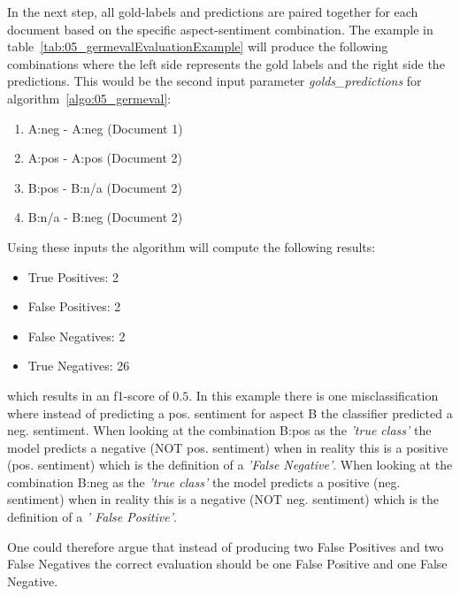 In the next step, all gold-labels and predictions are paired together for each document based on the specific aspect-sentiment combination. The example in table~\ref{tab:05_germevalEvaluationExample} will produce the following combinations where the left side represents the gold labels and the right side the predictions. This would be the second input parameter \textit{golds\_predictions} for algorithm~\ref{algo:05_germeval}: 

\begin{enumerate}
	\item A:neg - A:neg (Document 1)
	\item A:pos - A:pos (Document 2)
	\item B:pos - B:n/a (Document 2)
	\item B:n/a - B:neg (Document 2)
\end{enumerate}

Using these inputs the algorithm will compute the following results:

\begin{itemize}
	\item True Positives: 2
	\item False Positives: 2
	\item False Negatives: 2
	\item True Negatives: 26
\end{itemize}

which results in an f1-score of $0.5$. In this example there is one misclassification where instead of predicting a pos. sentiment for aspect B the classifier predicted a neg. sentiment. When looking at the combination B:pos as the \textit{'true class'} the model predicts a negative {(NOT pos. sentiment)} when in reality this is a positive {(pos. sentiment)} which is the definition of a \textit{'False Negative'}. When looking at the combination B:neg as the \textit{'true class'} the model predicts a positive {(neg. sentiment)} when in reality this is a negative {(NOT neg. sentiment)} which is the definition of a \textit{' False Positive'}.
\medskip

One could therefore argue that instead of producing two False Positives and two False Negatives the correct evaluation should be one False Positive and one False Negative.


